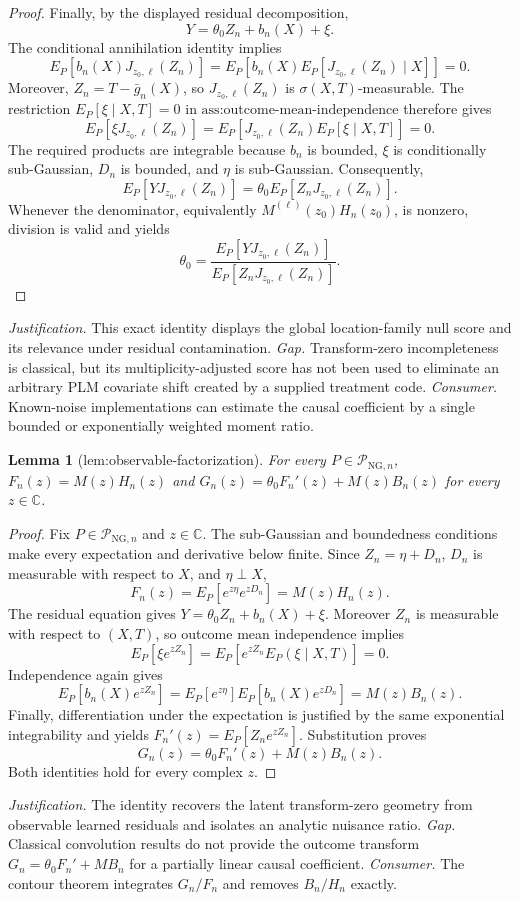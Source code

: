 \documentclass{article}
\newtheorem{lemma}{Lemma}
\begin{document}
\begin{proof}
Finally, by the displayed residual decomposition,
\[
 Y=\theta_0Z_n+b_n(X)+\xi.
\]
The conditional annihilation identity implies
\[
 E_P[b_n(X)J_{z_0,\ell}(Z_n)]
 =E_P\!\left[b_n(X)E_P[J_{z_0,\ell}(Z_n)\mid X]\right]=0.
\]
Moreover, \(Z_n=T-\bar g_n(X)\), so \(J_{z_0,\ell}(Z_n)\) is \(\sigma(X,T)\)-measurable.  The restriction \(E_P[\xi\mid X,T]=0\) in \(\text{ass:outcome-mean-independence}\) therefore gives
\[
 E_P[\xi J_{z_0,\ell}(Z_n)]
 =E_P\!\left[J_{z_0,\ell}(Z_n)E_P[\xi\mid X,T]\right]=0.
\]
The required products are integrable because \(b_n\) is bounded, \(\xi\) is conditionally sub-Gaussian, \(D_n\) is bounded, and \(\eta\) is sub-Gaussian.  Consequently,
\[
 E_P[YJ_{z_0,\ell}(Z_n)]
 =\theta_0E_P[Z_nJ_{z_0,\ell}(Z_n)].
\]
Whenever the denominator, equivalently \(M^{(\ell)}(z_0)H_n(z_0)\), is nonzero, division is valid and yields
\[
 \theta_0=
 \frac{E_P[YJ_{z_0,\ell}(Z_n)]}
      {E_P[Z_nJ_{z_0,\ell}(Z_n)]}.
\]
\end{proof}
\par\smallskip\noindent \textit{Justification.} This exact identity displays the global location-family null score and its relevance under residual contamination. \textit{Gap.} Transform-zero incompleteness is classical, but its multiplicity-adjusted score has not been used to eliminate an arbitrary PLM covariate shift created by a supplied treatment code. \textit{Consumer.} Known-noise implementations can estimate the causal coefficient by a single bounded or exponentially weighted moment ratio.

\begin{lemma}[lem:observable-factorization]\label{lem:observable-factorization}
For every \(P\in\mathcal P_{\mathrm{NG},n}\), \(F_n(z)=M(z)H_n(z)\) and \(G_n(z)=\theta_0F_n'(z)+M(z)B_n(z)\) for every \(z\in\mathbb C\).
\end{lemma}
\begin{proof}
Fix \(P\in\mathcal P_{\mathrm{NG},n}\) and \(z\in\mathbb C\).  The sub-Gaussian and boundedness conditions make every expectation and derivative below finite.  Since \(Z_n=\eta+D_n\), \(D_n\) is measurable with respect to \(X\), and \(\eta\perp X\),
\[
 F_n(z)=E_P[e^{z\eta}e^{zD_n}]=M(z)H_n(z).
\]
The residual equation gives \(Y=\theta_0Z_n+b_n(X)+\xi\).  Moreover \(Z_n\) is measurable with respect to \((X,T)\), so outcome mean independence implies
\[
 E_P[\xi e^{zZ_n}]
 =E_P[e^{zZ_n}E_P(\xi\mid X,T)]=0.
\]
Independence again gives
\[
 E_P[b_n(X)e^{zZ_n}]
 =E_P[e^{z\eta}]E_P[b_n(X)e^{zD_n}]=M(z)B_n(z).
\]
Finally, differentiation under the expectation is justified by the same exponential integrability and yields \(F_n'(z)=E_P[Z_ne^{zZ_n}]\).  Substitution proves
\[
 G_n(z)=\theta_0F_n'(z)+M(z)B_n(z).
\]
Both identities hold for every complex \(z\).
\end{proof}
\par\smallskip\noindent \textit{Justification.} The identity recovers the latent transform-zero geometry from observable learned residuals and isolates an analytic nuisance ratio. \textit{Gap.} Classical convolution results do not provide the outcome transform \(G_n=\theta_0F_n'+MB_n\) for a partially linear causal coefficient. \textit{Consumer.} The contour theorem integrates \(G_n/F_n\) and removes \(B_n/H_n\) exactly.
\end{document}
